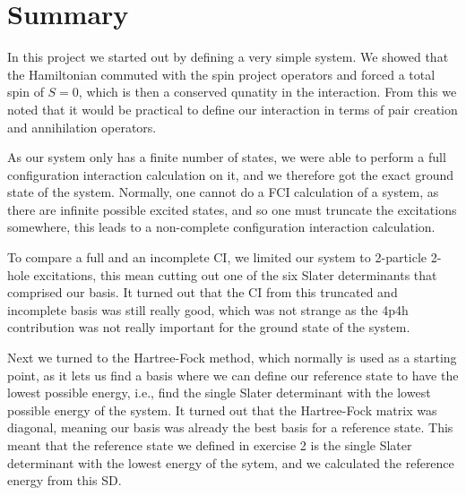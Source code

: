\documentclass[a4paper, 11pt, notitlepage, english]{article}
\begin{document}
\section*{Summary}

In this project we started out by defining a very simple system. We showed that the Hamiltonian commuted with the spin project operators and forced a total spin of $S=0$, which is then a conserved qunatity in the interaction. From this we noted that it would be practical to define our interaction in terms of pair creation and annihilation operators.

As our system only has a finite number of states, we were able to perform a full configuration interaction calculation on it, and we therefore got the exact ground state of the system. Normally, one cannot do a FCI calculation of a system, as there are infinite possible excited states, and so one must truncate the excitations somewhere, this leads to a non-complete configuration interaction calculation.

To compare a full and an incomplete CI, we limited our system to 2-particle 2-hole excitations, this mean cutting out one of the six Slater determinants that comprised our basis. It turned out that the CI from this truncated and incomplete basis was still really good, which was not strange as the 4p4h contribution was not really important for the ground state of the system.

Next we turned to the Hartree-Fock method, which normally is used as a starting point, as it lets us find a basis where we can define our reference state to have the lowest possible energy, i.e., find the single Slater determinant with the lowest possible energy of the system. It turned out that the Hartree-Fock matrix was diagonal, meaning our basis was already the best basis for a reference state. This meant that the reference state we defined in exercise 2 is the single Slater determinant with the lowest energy of the sytem, and we calculated the reference energy from this SD. 
\end{document}
